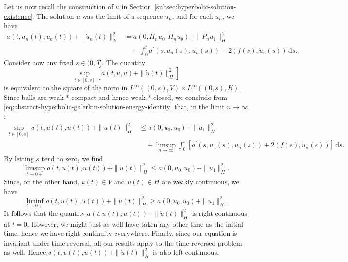 Let us now recall the construction of $u$ in Section~\ref{subsec:hyperbolic-solution-existence}. The solution $u$ was the limit of a sequence $u_n$, and for each $u_n$, we have
\begin{equation}\label{eq:abstract-hyperbolic-galerkin-solution-energy-identity}
\begin{aligned}a(t,u_n(t),u_n(t))+\|\dot u_n(t)\|_H^2&=a(0,\Pi_nu_0,\Pi_nu_0)+\|P_nu_1\|_H^2\\&\quad+\int_0^t a^{\prime}(s,u_n(s),u_n(s))+2(f(s),\dot u_n(s))\,\mathrm{d}s.\end{aligned}
\end{equation}
Consider now any fixed $s\in(0,T]$. The quantity
\begin{equation}\label{eq:abstract-hyperbolic-sup-energy-equivalent-norm}
\sup_{t\in[0,s]}[a(t,u,u)+\|\dot u(t)\|_H^2]
\end{equation}
is equivalent to the square of the norm in $L^\infty((0,s),V)\times L^\infty((0,s),H)$. Since balls are weak-*-compact and hence weak-*-closed, we conclude from \eqref{eq:abstract-hyperbolic-galerkin-solution-energy-identity} that, in the limit $n\to\infty$:
\begin{equation}\label{eq:abstract-hyperbolic-limit-sup-energy-upper-bound}
\begin{aligned}\sup_{t\in[0,s]}a(t,u(t),u(t))+\|\dot u(t)\|_H^2&\leq a(0,u_0,u_0)+\|u_1\|_H^2\\&\quad+\limsup_{n\to\infty}\int_0^s[a^{\prime}(s,u_n(s),u_n(s))+2(f(s),\dot u_n(s))]\,\mathrm{d}s.\end{aligned}
\end{equation}
By letting $s$ tend to zero, we find
\begin{equation}\label{eq:abstract-hyperbolic-initial-right-limsup-energy}
\limsup_{t\to0+}a(t,u(t),u(t))+\|\dot u(t)\|_H^2\leq a(0,u_0,u_0)+\|u_1\|_H^2.
\end{equation}
Since, on the other hand, $u(t)\in V$ and $\dot u(t)\in H$ are weakly continuous, we have
\begin{equation}\label{eq:abstract-hyperbolic-initial-right-liminf-energy}
\liminf_{t\to0+}a(t,u(t),u(t))+\|\dot u(t)\|_H^2\geq a(0,u_0,u_0)+\|u_1\|_H^2.
\end{equation}
It follows that the quantity $a(t,u(t),u(t))+\|\dot u(t)\|_H^2$ is right continuous at $t=0$. However, we might just as well have taken any other time as the initial time; hence we have right continuity everywhere. Finally, since our equation is invariant under time reversal, all our results apply to the time-reversed problem as well. Hence $a(t,u(t),u(t))+\|\dot u(t)\|_H^2$ is also left continuous.

